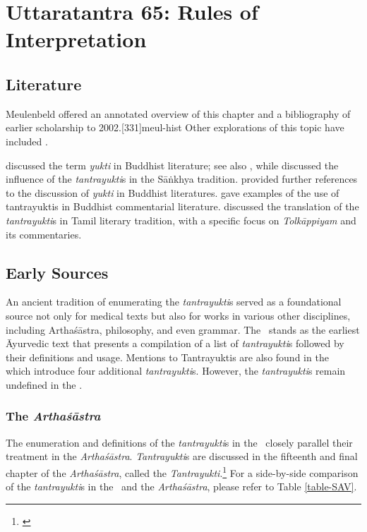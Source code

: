 
\chapter[Uttaratantra 65:  Rules of Interpretation]{Uttaratantra 65:  
Rules of Interpretation}

\section{Literature} 

Meulenbeld offered an annotated overview of this chapter and a bibliography
of earlier scholarship to 2002.[331]{meul-hist} 
Other explorations  of this topic have included \cite{
dasg-1952,
lele-1981,
mejo-2000,
nara-1949,
ober-1968,
scha-1993,
sing-2003,
muth-1976,
comb-1994}. 


 \citet{sche-1981} discussed the term \emph{yukti} in Buddhist
literature; see also \cite[444--446]{biar-1964} \cite[343--345]{pret-1991}, 
while
\cite{frau-1958} discussed the influence of the \emph{tantrayukti}s in the 
Sāṅkhya tradition.
\citet[105--106, fn.\,109]{prei-2013} provided further references to the
discussion of \emph{yukti} in Buddhist literatures. \citet{mane-2008}
gave examples of the use of tantrayuktis in Buddhist commentarial
literature. \citet{chev-2009} discussed the translation of the 
\emph{tantrayukti}s in Tamil literary tradition, with a specific focus on 
\emph{Tolkāppiyam} and its commentaries.


\section{Early Sources}

An ancient tradition of enumerating the \emph{tantrayukti}s served as a 
foundational source not only for medical texts but also for works in various other 
disciplines, including Arthaśāstra, philosophy, and even grammar. The \SS\  
stands 
as the earliest Āyurvedic text that presents a compilation of a list of 
\emph{tantrayukti}s followed by their definitions and usage. Mentions to 
Tantrayuktis are also found in the \CS\  \Ca{8.12}{} which introduce four 
additional 
\emph{tantrayukti}s. However, the \emph{tantrayukti}s remain undefined in 
the 
\CS. 

\subsection{The \emph{Arthaśāstra}} 
The enumeration and definitions of the \emph{tantrayukti}s in the 
\SS\  closely parallel their treatment in the \emph{Arthaśāstra}. 
\emph{Tantrayukti}s are discussed in the fifteenth and final chapter of the 
\emph{Arthaśāstra}, called the 
\emph{Tantrayukti}.\footnote{\cite[280--283]{kang-1960}} For a side-by-side 
comparison of the \emph{tantrayukti}s in the \SS\ and the \emph{Arthaśāstra}, 
please refer to Table \ref{table-SAV}.


